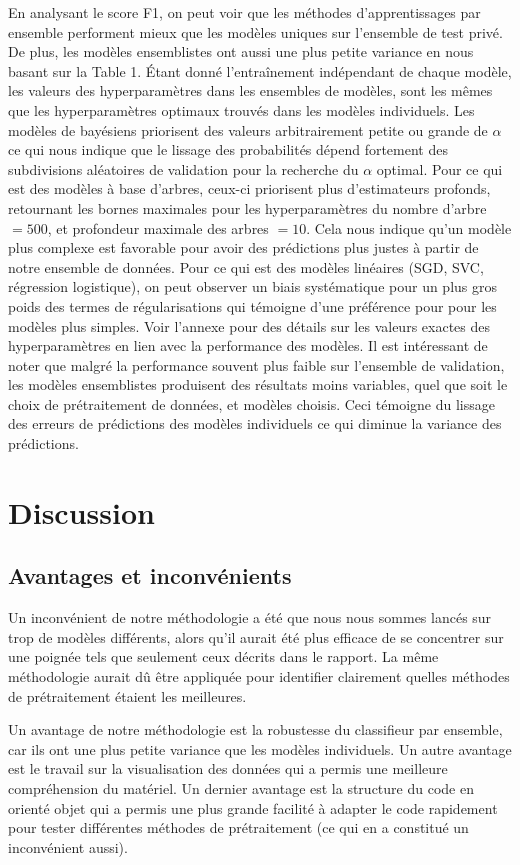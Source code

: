 \documentclass{article}
\begin{document}
En analysant le score F1, on peut voir que les méthodes d'apprentissages par ensemble performent mieux que les modèles uniques sur l'ensemble de test privé. De plus, les modèles ensemblistes ont aussi une plus petite variance en nous basant sur la Table 1. Étant donné l'entraînement indépendant de chaque modèle, les valeurs des hyperparamètres dans les ensembles de modèles, sont les mêmes que les hyperparamètres optimaux trouvés dans les modèles individuels. Les modèles de bayésiens priorisent des valeurs arbitrairement petite ou grande de $\alpha$ ce qui nous indique que le lissage des probabilités dépend fortement des subdivisions aléatoires de validation pour la recherche du $\alpha$ optimal. Pour ce qui est des modèles à base d'arbres, ceux-ci priorisent plus d'estimateurs profonds, retournant les bornes maximales pour les hyperparamètres du nombre d'arbre $=500$, et profondeur maximale des arbres $=10$. Cela nous indique qu'un modèle plus complexe est favorable pour avoir des prédictions plus justes à partir de notre ensemble de données. Pour ce qui est des modèles linéaires (SGD, SVC, régression logistique), on peut observer un biais systématique pour un plus gros poids des termes de régularisations qui témoigne d'une préférence pour pour les modèles plus simples. Voir l'annexe pour des détails sur les valeurs exactes des hyperparamètres en lien avec la performance des modèles. Il est intéressant de noter que malgré la performance souvent plus faible sur l'ensemble de validation, les modèles ensemblistes produisent des résultats moins variables, quel que soit le choix de prétraitement de données, et modèles choisis. Ceci témoigne du lissage des erreurs de prédictions des modèles individuels ce qui diminue la variance des prédictions.
\section{Discussion}
\subsection{Avantages et inconvénients}
Un inconvénient de notre méthodologie a été que nous nous sommes lancés sur trop de modèles différents, alors qu'il aurait été plus efficace de se concentrer sur une poignée tels que seulement ceux décrits dans le rapport. La même méthodologie aurait dû être appliquée pour identifier clairement quelles méthodes de prétraitement étaient les meilleures.

Un avantage de notre méthodologie est la robustesse du classifieur par ensemble, car ils ont une plus petite variance que les modèles individuels. Un autre avantage est le travail sur la visualisation des données qui a permis une meilleure compréhension du matériel. Un dernier avantage est la structure du code en orienté objet qui a permis une plus grande facilité à adapter le code rapidement pour tester différentes méthodes de prétraitement (ce qui en a constitué un inconvénient aussi).
\end{document}
